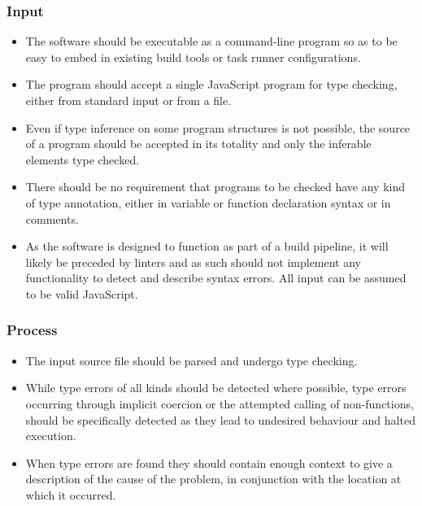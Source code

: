 \documentclass[british, twoside, openright]{bhamthesis}
\theoremstyle{definition}
\begin{document}
  \subsubsection{Input}
  \begin{itemize}
    \item The software should be executable as a command-line program so as to be easy to embed in existing build tools or task runner configurations.
    \item The program should accept a single JavaScript program for type checking, either from standard input or from a file.
    \item Even if type inference on some program structures is not possible, the source of a program should be accepted in its totality and only the inferable elements type checked.
    \item There should be no requirement that programs to be checked have any kind of type annotation, either in variable or function declaration syntax or in comments.
    \item As the software is designed to function as part of a build pipeline, it will likely be preceded by linters and as such should not implement any functionality to detect and describe syntax errors. All input can be assumed to be valid JavaScript.
  \end{itemize}

  \subsubsection{Process}
  \begin{itemize}
    \item The input source file should be parsed and undergo type checking.
    \item While type errors of all kinds should be detected where possible, type errors occurring through implicit coercion or the attempted calling of non-functions, should be specifically detected as they lead to undesired behaviour and halted execution.
    \item When type errors are found they should contain enough context to give a description of the cause of the problem, in conjunction with the location at which it occurred.
  \end{itemize}
\end{document}
